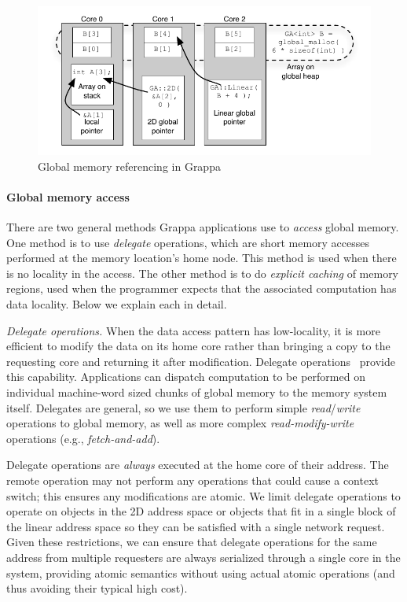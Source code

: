 \begin{figure}[t]
\begin{center}
  \includegraphics[width=0.95\columnwidth]{figs/memory-structure}
\begin{minipage}{0.95\columnwidth}
  \caption{\label{fig:memory-structure} Global memory referencing in Grappa}
\end{minipage}
\vspace{-3ex}
\end{center}
\end{figure}

\paragraph{Global memory access} There are two general methods Grappa
applications use to {\em access} global memory. One method is to use {\em
delegate} operations, which are short memory accesses performed at the memory
location's home node. This method is used when there is no locality in the
access. The other method is to do {\em explicit caching} of memory regions,
used when the programmer expects that the associated computation has data
locality. Below we explain each in detail.


\vspace{1ex} \textit{Delegate operations.} When the data access pattern has
low-locality, it is more efficient to modify the data on its home core rather
than bringing a copy to the requesting core and returning it after
modification. Delegate operations~\cite{Nelson:hotpar11, delegated:oopsla11}
provide this capability. Applications can dispatch computation to be performed
on individual machine-word sized chunks of global memory to the memory system
itself. Delegates are general, so we use them to perform simple
\emph{read\/}/\emph{write\/} operations to global memory, as well as more complex \emph{read-modify-write\/} operations (e.g., \emph{fetch-and-add\/}). 

Delegate operations are \emph{always\/} executed at the home core of their
address. The remote operation may not perform any operations that could cause
a context switch; this ensures any modifications are atomic. We limit delegate
operations to operate on objects in the 2D address space or objects that fit
in a single block of the linear address space so they can be satisfied with a
single network request. Given these restrictions, we can ensure that delegate
operations for the same address from multiple requesters are always serialized
through a single core in the system, providing atomic semantics without using
actual atomic operations (and thus avoiding their typical high cost).

